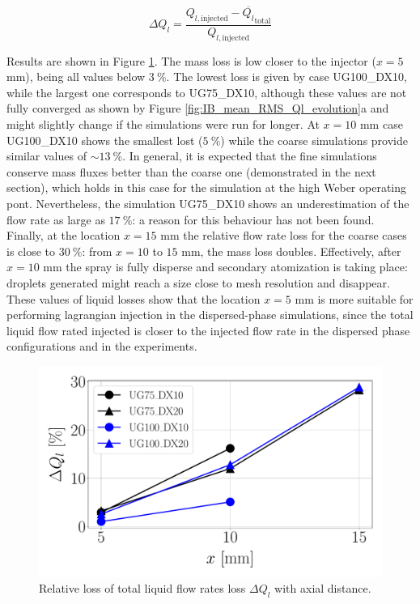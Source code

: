 \begin{equation}
\Delta Q_l = \frac{Q_{l,\mathrm{injected}} - \overline{Q_l}_{\mathrm{total}}}{Q_{l,\mathrm{injected}}}
\end{equation}

Results are shown in Figure \ref{fig:delta_Ql_with_x}. The mass loss is low closer to the injector ($x = 5$ mm), being all values below $3~\%$. The lowest loss is given by case UG100\_DX10, while the largest one corresponds to UG75\_DX10, although these values are not fully converged as shown by Figure \ref{fig:IB_mean_RMS_Ql_evolution}a and might slightly change if the simulations were run for longer. At $x = 10$ mm case UG100\_DX10 shows the smallest lost ($5~\%$) while the coarse simulations provide similar values of $\sim 13~\%$. In general, it is expected that the fine simulations conserve mass fluxes better than the coarse one (demonstrated in the next section), which holds in this case for the simulation at the high Weber operating pont. Nevertheless, the simulation UG75\_DX10 shows an underestimation of the flow rate as large as $17~\%$: a reason for this behaviour has not been found. Finally, at the location $x = 15$ mm the relative flow rate loss for the coarse cases is close to $30~\%$: from $x = 10$ to $15$ mm, the mass loss doubles. Effectively, after $x = 10$ mm the spray is fully disperse and secondary atomization is taking place: droplets generated might reach a size close to mesh resolution and disappear. These values of liquid losses show that the location $x = 5$ mm is more suitable for performing lagrangian injection in the dispersed-phase simulations, since the total liquid flow rated injected is closer to the injected flow rate in the dispersed phase configurations and in the experiments.

\begin{figure}[ht]
	\centering
   \includegraphics[scale=0.3]{./part2_developments/figures_ch5_resolved_JICF/flow_rates_ibs/Ql_loss_with_x}
   \vspace*{-0.1in}
   \caption{Relative loss of total liquid flow rates loss $\Delta Q_l$ with axial distance.}
   \label{fig:delta_Ql_with_x}
\end{figure}





